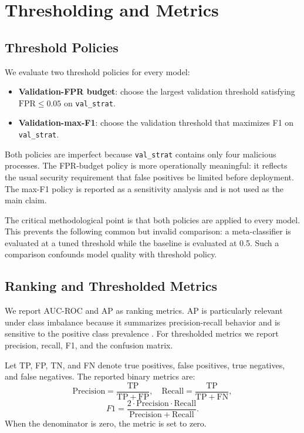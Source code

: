 \documentclass[10pt,journal,compsoc]{IEEEtran}
\begin{document}
\section{Thresholding and Metrics}
\label{sec:thresholds}

\subsection{Threshold Policies}

We evaluate two threshold policies for every model:
\begin{itemize}
    \item \textbf{Validation-FPR budget}: choose the largest validation threshold satisfying $\mathrm{FPR} \leq 0.05$ on \texttt{val\_strat}.
    \item \textbf{Validation-max-F1}: choose the validation threshold that maximizes F1 on \texttt{val\_strat}.
\end{itemize}
Both policies are imperfect because \texttt{val\_strat} contains only four malicious processes. The FPR-budget policy is more operationally meaningful: it reflects the usual security requirement that false positives be limited before deployment. The max-F1 policy is reported as a sensitivity analysis and is not used as the main claim.

The critical methodological point is that both policies are applied to every model. This prevents the following common but invalid comparison: a meta-classifier is evaluated at a tuned threshold while the baseline is evaluated at 0.5. Such a comparison confounds model quality with threshold policy.

\subsection{Ranking and Thresholded Metrics}

We report AUC-ROC and AP as ranking metrics. AP is particularly relevant under class imbalance because it summarizes precision-recall behavior and is sensitive to the positive class prevalence \cite{saito2015}. For thresholded metrics we report precision, recall, F1, and the confusion matrix.

Let TP, FP, TN, and FN denote true positives, false positives, true negatives, and false negatives. The reported binary metrics are:
\[
\mathrm{Precision} = \frac{\mathrm{TP}}{\mathrm{TP}+\mathrm{FP}},
\quad
\mathrm{Recall} = \frac{\mathrm{TP}}{\mathrm{TP}+\mathrm{FN}},
\]
\[
F1 = \frac{2\cdot \mathrm{Precision}\cdot \mathrm{Recall}}{\mathrm{Precision}+\mathrm{Recall}}.
\]
When the denominator is zero, the metric is set to zero.
\end{document}
